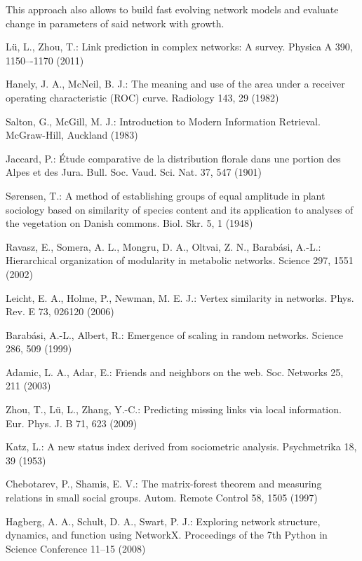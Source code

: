 \documentclass{llncs}
\begin{document}
This approach also allows to build fast evolving network models and evaluate change in parameters of said network with growth.
%
%
%
\begin{thebibliography}{26}

L{\"u}, L., Zhou, T.:
Link prediction in complex networks: A survey.
Physica A 390, 1150–-1170 (2011)

Hanely, J. A., McNeil, B. J.:
The meaning and use of the area under a receiver operating characteristic (ROC) curve.
Radiology 143, 29 (1982)

Salton, G., McGill, M. J.:
Introduction to Modern Information Retrieval.
McGraw-Hill, Auckland (1983)

Jaccard, P.:
{\'E}tude comparative de la distribution florale dans une portion des Alpes et des Jura.
Bull. Soc. Vaud. Sci. Nat. 37, 547 (1901)

S{\o}rensen, T.: 
A method of establishing groups of equal amplitude in plant sociology based on similarity of species content and its application to analyses of the vegetation on Danish commons.
Biol. Skr. 5, 1 (1948)

Ravasz, E., Somera, A. L., Mongru, D. A., Oltvai, Z. N., Barab{\'a}si, A.-L.:
Hierarchical organization of modularity in metabolic networks. 
Science 297, 1551 (2002)

Leicht, E. A., Holme, P., Newman, M. E. J.:
Vertex similarity in networks.
Phys. Rev. E 73, 026120 (2006)

Barab{\'a}si, A.-L., Albert, R.:
Emergence of scaling in random networks.
Science 286, 509 (1999)

Adamic, L. A., Adar, E.:
Friends and neighbors on the web.
Soc. Networks 25, 211 (2003)

Zhou, T., L{\"u}, L., Zhang, Y.-C.:
Predicting missing links via local information.
Eur. Phys. J. B 71, 623 (2009)

Katz, L.:
A new status index derived from sociometric analysis.
Psychmetrika 18, 39 (1953)

Chebotarev, P., Shamis, E. V.:
The matrix-forest theorem and measuring relations in small social groups.
Autom. Remote Control 58, 1505 (1997)

Hagberg, A. A., Schult, D. A., Swart, P. J.: 
Exploring network structure, dynamics, and function using NetworkX.
Proceedings of the 7th Python in Science Conference 11--15 (2008)


\end{thebibliography}
\end{document}
